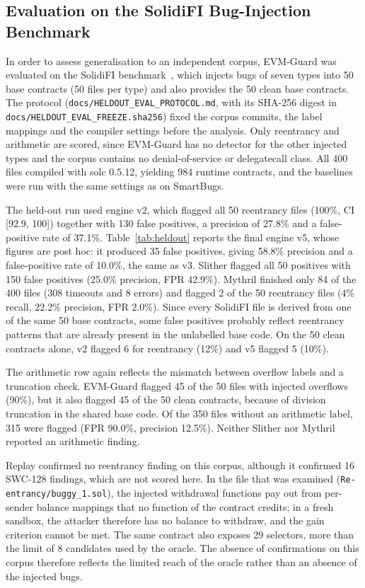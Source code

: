 \documentclass[pdflatex,sn-mathphys]{sn-jnl}
\theoremstyle{thmstyletwo}
\theoremstyle{thmstyletwo}
\begin{document}
\subsection{Evaluation on the SolidiFI Bug-Injection Benchmark}\label{sec:results:heldout}
In order to assess generalisation to an independent corpus, EVM-Guard was evaluated on the SolidiFI benchmark~\cite{ghaleb2020how}, which injects bugs of seven types into 50 base contracts (50 files per type) and also provides the 50 clean base contracts. The protocol (\texttt{docs/HELDOUT\_EVAL\_PROTOCOL.md}, with its SHA-256 digest in \texttt{docs/HELDOUT\_EVAL\_FREEZE.sha256}) fixed the corpus commits, the label mappings and the compiler settings before the analysis. Only reentrancy and arithmetic are scored, since EVM-Guard has no detector for the other injected types and the corpus contains no denial-of-service or delegatecall class. All 400 files compiled with solc 0.5.12, yielding 984 runtime contracts, and the baselines were run with the same settings as on SmartBugs.

The held-out run used engine v2, which flagged all 50 reentrancy files (100\%, CI [92.9, 100]) together with 130 false positives, a precision of 27.8\% and a false-positive rate of 37.1\%. Table~\ref{tab:heldout} reports the final engine v5, whose figures are post hoc: it produced 35 false positives, giving 58.8\% precision and a false-positive rate of 10.0\%, the same as v3. Slither flagged all 50 positives with 150 false positives (25.0\% precision, FPR 42.9\%). Mythril finished only 84 of the 400 files (308 timeouts and 8 errors) and flagged 2 of the 50 reentrancy files (4\% recall, 22.2\% precision, FPR 2.0\%). Since every SolidiFI file is derived from one of the same 50 base contracts, some false positives probably reflect reentrancy patterns that are already present in the unlabelled base code. On the 50 clean contracts alone, v2 flagged 6 for reentrancy (12\%) and v5 flagged 5 (10\%).

The arithmetic row again reflects the mismatch between overflow labels and a truncation check. EVM-Guard flagged 45 of the 50 files with injected overflows (90\%), but it also flagged 45 of the 50 clean contracts, because of division truncation in the shared base code. Of the 350 files without an arithmetic label, 315 were flagged (FPR 90.0\%, precision 12.5\%). Neither Slither nor Mythril reported an arithmetic finding.

Replay confirmed no reentrancy finding on this corpus, although it confirmed 16 SWC-128 findings, which are not scored here. In the file that was examined (\texttt{Re-entrancy/buggy\_1.sol}), the injected withdrawal functions pay out from per-sender balance mappings that no function of the contract credits; in a fresh sandbox, the attacker therefore has no balance to withdraw, and the gain criterion cannot be met. The same contract also exposes 29 selectors, more than the limit of 8 candidates used by the oracle. The absence of confirmations on this corpus therefore reflects the limited reach of the oracle rather than an absence of the injected bugs.
\end{document}
